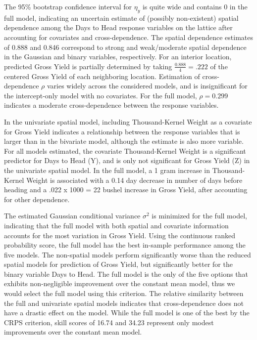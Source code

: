 \documentclass[12pt, a4paper, twoside]{article}
\begin{document}
 The 95\% bootstrap confidence interval for $\eta_{y}$ is quite wide and contains 0  in the full model, indicating an uncertain estimate of (possibly non-existent) spatial dependence among the Days to Head response variables on the lattice after accounting for covariates and cross-dependence. The spatial dependence estimates of 0.888 and 0.846 correspond to strong and weak/moderate spatial dependence in the Gaussian and binary variables, respectively. For an interior location, predicted Gross Yield is partially determined by taking $\frac{0.888}{4}=.222$ of the centered Gross Yield of each neighboring location. Estimation of cross-dependence $\rho$ varies widely across the considered models, and is insignificant for the intercept-only model with no covariates. For the full model, $\rho=0.299$ indicates a moderate cross-dependence between the response variables.

In the univariate spatial model, including Thousand-Kernel Weight as a covariate for Gross Yield indicates a relationship between the response variables that is larger than in the bivariate model, although the estimate is also more variable. For all models estimated, the covariate Thousand-Kernel Weight is a significant predictor for Days to Head (Y), and is only not significant for Gross Yield (Z) in the univariate spatial model. In the full model, a 1 gram increase in Thousand-Kernel Weight is associated with a 0.14 day decrease in number of days before heading and a .022 x 1000 = 22 bushel increase in Gross Yield, after accounting for other dependence. 

The estimated Gaussian conditional variance $\sigma^2$ is minimized for the full model, indicating that the full model with both spatial and covariate information accounts for the most variation in Gross Yield.  Using the continuous ranked probability score, the full model has the best in-sample performance among the five models. The non-spatial models perform significantly worse than the reduced spatial models for prediction of Gross Yield, but significantly better for the binary variable Days to Head. The full model is the only of the five options that exhibits non-negligible improvement over the constant mean model, thus we would select the full model using this criterion. The relative similarity between the full and univariate spatial models indicates that cross-dependence does not have a drastic effect on the model. While the full model is one of the best by the CRPS criterion, skill scores of 16.74 and 34.23 represent only modest improvements over the constant mean model.
\end{document}
